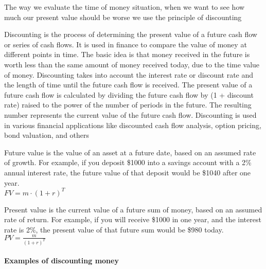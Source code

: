 \documentclass{article}
\theoremstyle{mytheoremstyle}
\theoremstyle{mytheoremstyle}
\theoremstyle{myproblemstyle}
\begin{document}
The way we evaluate the time of money situation, when we want to see how much our present value should be worse we use the principle of discounting
\begin{definition}[Discounting]
	Discounting is the process of determining the present value of a future cash flow or series of cash flows. It is used in finance to compare the value of money at different points in time. The basic idea is that money received in the future is worth less than the same amount of money received today, due to the time value of money. Discounting takes into account the interest rate or discount rate and the length of time until the future cash flow is received. The present value of a future cash flow is calculated by dividing the future cash flow by (1 + discount rate) raised to the power of the number of periods in the future. The resulting number represents the current value of the future cash flow. Discounting is used in various financial applications like discounted cash flow analysis, option pricing, bond valuation, and others \\


	\begin{definition}
		Future value is the value of an asset at a future date, based on an assumed rate of growth. For example, if you deposit \$1000 into a savings account with a 2\% annual interest rate, the future value of that deposit would be \$1040 after one year.\\
		\begin{math}
			FV = m \cdot (1+r)^{T}
		\end{math}


	\end{definition}

	\begin{definition}
		Present value is the current value of a future sum of money, based on an assumed rate of return. For example, if you will receive \$1000 in one year, and the interest rate is 2\%, the present value of that future sum would be \$980 today.\\
		\begin{math}

			PV = \frac{m}{(1+r)^{T}}
		\end{math}

	\end{definition}
\end{definition}

\paragraph{Examples of discounting money}
\end{document}
